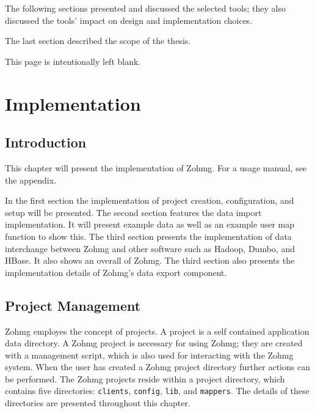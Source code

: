 The following sections presented and discussed the selected tools; they also
discussed the tools' impact on design and implementation choices.

The last section described the scope of the thesis.


\pagebreak
This page is intentionally left blank.
\pagebreak


\chapter{Implementation}



\section*{Introduction}

This chapter will present the implementation of Zohmg. For a usage manual, see
the appendix.


In the first section the implementation of project creation, configuration, and
setup will be presented. The second section features the data import
implementation. It will present example data as well as an example user map
function to show this. The third section presents the implementation of data
interchange between Zohmg and other software such as Hadoop, Dumbo, and HBase.
It also shows an overall of Zohmg. The third section also presents the
implementation details of Zohmg's data export component.


\section{Project Management}

Zohmg employes the concept of projects. A project is a self contained
application data directory. A Zohmg project is necessary for using Zohmg; they
are created with a management script, which is also used for interacting with
the Zohmg system. When the user has created a Zohmg project directory further
actions can be performed. The Zohmg projects reside within a project directory,
which contains five directories: \texttt{clients}, \texttt{config},
\texttt{lib}, and \texttt{mappers}. The details of these directories are
presented throughout this chapter.


